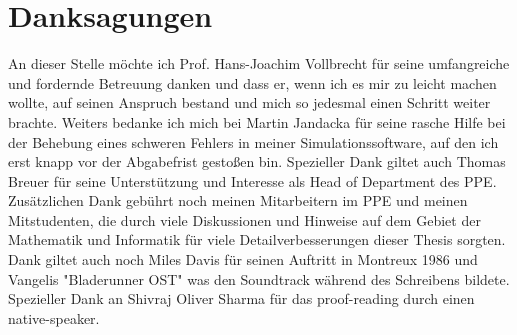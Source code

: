 \documentclass[Bachelorarbeit.tex]{subfiles}
\begin{document}
\chapter*{Danksagungen}
An dieser Stelle möchte ich Prof. Hans-Joachim Vollbrecht für seine umfangreiche und fordernde Betreuung danken und dass er, wenn ich es mir zu leicht machen wollte, auf seinen Anspruch bestand und mich so jedesmal einen Schritt weiter brachte. Weiters bedanke ich mich bei Martin Jandacka für seine rasche Hilfe bei der Behebung eines schweren Fehlers in meiner Simulationssoftware, auf den ich erst knapp vor der Abgabefrist gestoßen bin. Spezieller Dank giltet auch Thomas Breuer für seine Unterstützung und Interesse als Head of Department des PPE. Zusätzlichen Dank gebührt noch meinen Mitarbeitern im PPE und meinen Mitstudenten, die durch viele Diskussionen und Hinweise auf dem Gebiet der Mathematik und Informatik für viele Detailverbesserungen dieser Thesis sorgten. Dank giltet auch noch Miles Davis für seinen Auftritt in Montreux 1986 und Vangelis "Bladerunner OST" was den Soundtrack während des Schreibens bildete. Spezieller Dank an Shivraj Oliver Sharma für das proof-reading durch einen native-speaker.
\end{document}
